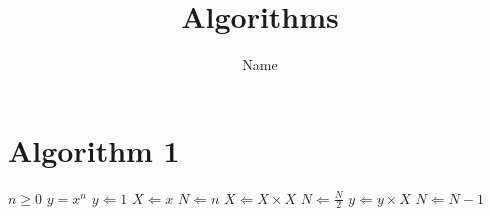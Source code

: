 \documentclass{article}
\title{Algorithms}
\author{Name}
\date{}
\begin{document}
\maketitle
\section{Algorithm 1}



\begin{algorithmic}
	\Require $n \geq 0$
	\Ensure $y = x^n$
	\State $y \Leftarrow 1$
	\State $X \Leftarrow x$
	\State $N \Leftarrow n$
	\State $X \Leftarrow X \times X$
	\State $N \Leftarrow \frac{N}{2} $  
	\State $y \Leftarrow y \times X$
	\State $N \Leftarrow N - 1$
	\EndIf
	\EndWhile
\end{algorithmic}
\end{document}

